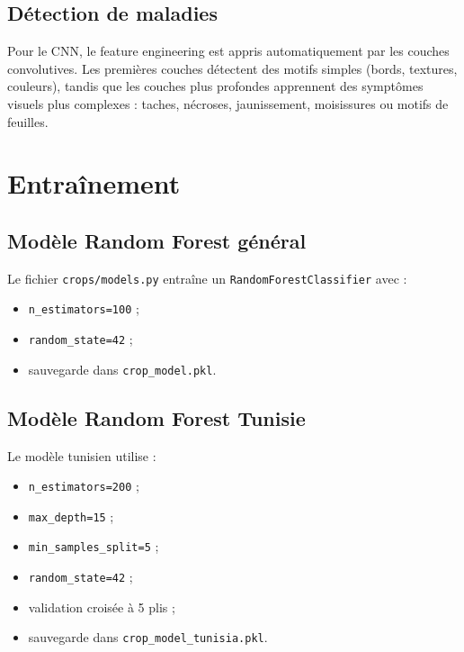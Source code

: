 \documentclass[12pt,a4paper]{report}
\begin{document}
\subsection{Détection de maladies}
Pour le CNN, le feature engineering est appris automatiquement par les couches convolutives. Les premières couches détectent des motifs simples (bords, textures, couleurs), tandis que les couches plus profondes apprennent des symptômes visuels plus complexes : taches, nécroses, jaunissement, moisissures ou motifs de feuilles.

\section{Entraînement}
\subsection{Modèle Random Forest général}
Le fichier \texttt{crops/models.py} entraîne un \texttt{RandomForestClassifier} avec :
\begin{itemize}[noitemsep]
  \item \texttt{n\_estimators=100} ;
  \item \texttt{random\_state=42} ;
  \item sauvegarde dans \texttt{crop\_model.pkl}.
\end{itemize}

\subsection{Modèle Random Forest Tunisie}
Le modèle tunisien utilise :
\begin{itemize}[noitemsep]
  \item \texttt{n\_estimators=200} ;
  \item \texttt{max\_depth=15} ;
  \item \texttt{min\_samples\_split=5} ;
  \item \texttt{random\_state=42} ;
  \item validation croisée à 5 plis ;
  \item sauvegarde dans \texttt{crop\_model\_tunisia.pkl}.
\end{itemize}
\end{document}

